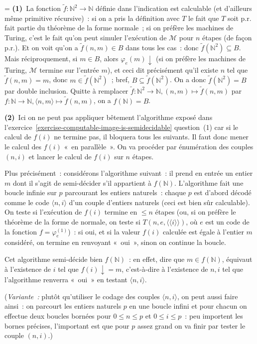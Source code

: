 \documentclass[12pt,a4paper]{article}
\theoremstyle{definition}
\newcommand{\dbllangle}{\mathopen{\langle\!\langle}}
\newcommand{\dblrangle}{\mathclose{\rangle\!\rangle}}
\newif\ifcorrige
\newenvironment{corrige}%
{\ifcorrige\relax\else\setbox0=\vbox\bgroup\fi%
\smallbreak\footnotesize\noindent{\underbar{\textit{Corrigé.}}\quad}}
{{\hbox{}\nobreak\hfill\checkmark}%
\ifcorrige\relax\else\egroup\fi\par}
\begin{document}
\begin{corrige}
\textbf{(1)} La fonction $\tilde f \colon \mathbb{N}^2 \to \mathbb{N}$
définie dans l'indication est calculable (et d'ailleurs même primitive
récursive) : si on a pris la définition avec $T$ le fait que $T$ soit
p.r. fait partie du théorème de la forme normale ; si on préfère les
machines de Turing, c'est le fait qu'on peut simuler l'exécution de
$\mathscr{M}$ pour $n$ étapes (de façon p.r.).  Et on voit qu'on a
$\tilde f(n,m) \in B$ dans tous les cas : donc $\tilde f(\mathbb{N}^2)
\subseteq B$.  Mais réciproquement, si $m \in B$, alors
$\varphi_e(m)\downarrow$ (si on préfère les machines de Turing,
$\mathscr{M}$ termine sur l'entrée $m$), et ceci dit précisément qu'il
existe $n$ tel que $\tilde f(n,m) = m$, donc $m \in \tilde
f(\mathbb{N}^2)$ ; bref, $B \subseteq \tilde f(\mathbb{N}^2)$.  On a
donc $\tilde f(\mathbb{N}^2) = B$ par double inclusion.  Quitte à
remplacer $\tilde f \colon \mathbb{N}^2 \to \mathbb{N}, (n,m) \mapsto
\tilde f(n,m)$ par $f \colon \mathbb{N} \to \mathbb{N}, \langle
n,m\rangle \mapsto \tilde f(n,m)$, on a $f(\mathbb{N}) = B$.

\textbf{(2)} Ici on ne peut pas appliquer bêtement l'algorithme exposé
dans l'exercice \ref{exercise-computable-image-is-semidecidable}
question (1) car si le calcul de $f(i)$ ne termine pas, il bloquera
tous les suivants.  Il faut donc mener le calcul des $f(i)$ « en
parallèle ».  On va procéder par énumération des couples $(n,i)$ et
lancer le calcul de $f(i)$ sur $n$ étapes.

Plus précisément : considérons l'algorithme suivant : il prend en
entrée un entier $m$ dont il s'agit de semi-décider s'il appartient à
$f(\mathbb{N})$.  L'algorithme fait une boucle infinie sur $p$
parcourant les entiers naturels : chaque $p$ est d'abord décodé comme
le code $\langle n,i\rangle$ d'un couple d'entiers naturels (ceci est
bien sûr calculable).  On teste si l'exécution de $f(i)$ termine en
$\leq n$ étapes (ou, si on préfère le théorème de la forme de normale,
on teste si $T(n,e,\dbllangle i\dblrangle)$, où $e$ est un code de la
fonction $f = \varphi^{(1)}_e$) : si oui, et si la valeur $f(i)$
calculée est égale à l'entier $m$ considéré, on termine en renvoyant
« oui », sinon on continue la boucle.

Cet algorithme semi-décide bien $f(\mathbb{N})$ : en effet, dire que
$m \in f(\mathbb{N})$, équivaut à l'existence de $i$ tel que
$f(i){\downarrow} = m$, c'est-à-dire à l'existence de $n,i$ tel que
l'algorithme renverra « oui » en testant $\langle n,i\rangle$.

(\emph{Variante :} plutôt qu'utiliser le codage des couples $\langle
n,i\rangle$, on peut aussi faire ainsi : on parcourt les entiers
naturels $p$ en une boucle infini et pour chacun on effectue deux
boucles bornées pour $0\leq n\leq p$ et $0\leq i\leq p$ : peu
importent les bornes précises, l'important est que pour $p$ assez
grand on va finir par tester le couple $(n,i)$.)
\end{corrige}
\end{document}
